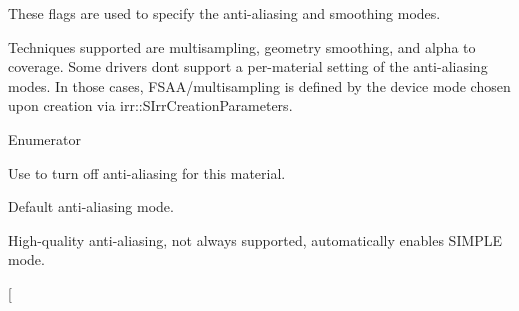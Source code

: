 These flags are used to specify the anti-\/aliasing and smoothing modes. 

Techniques supported are multisampling, geometry smoothing, and alpha to coverage. Some drivers don\textquotesingle{}t support a per-\/material setting of the anti-\/aliasing modes. In those cases, F\+S\+A\+A/multisampling is defined by the device mode chosen upon creation via irr\+::\+S\+Irr\+Creation\+Parameters. \begin{Desc}
\item[Enumerator]\par
\begin{description}
\item[{\em 
E\+A\+A\+M\+\_\+\+O\+FF\hypertarget{namespaceirr_1_1video_aa8647c2a52bdd3bc15ee773e8f2b149dab88de631372a6fc318762f20f1095433}{}\label{namespaceirr_1_1video_aa8647c2a52bdd3bc15ee773e8f2b149dab88de631372a6fc318762f20f1095433}
}]Use to turn off anti-\/aliasing for this material. \item[{\em 
E\+A\+A\+M\+\_\+\+S\+I\+M\+P\+LE\hypertarget{namespaceirr_1_1video_aa8647c2a52bdd3bc15ee773e8f2b149da05900b0839b8484a7ff78dbdac7e5dd7}{}\label{namespaceirr_1_1video_aa8647c2a52bdd3bc15ee773e8f2b149da05900b0839b8484a7ff78dbdac7e5dd7}
}]Default anti-\/aliasing mode. \item[{\em 
E\+A\+A\+M\+\_\+\+Q\+U\+A\+L\+I\+TY\hypertarget{namespaceirr_1_1video_aa8647c2a52bdd3bc15ee773e8f2b149da25f380a6b1ba75d0dc08ea624974ebd8}{}\label{namespaceirr_1_1video_aa8647c2a52bdd3bc15ee773e8f2b149da25f380a6b1ba75d0dc08ea624974ebd8}
}]High-\/quality anti-\/aliasing, not always supported, automatically enables S\+I\+M\+P\+LE mode. \item[{\em 
}
\end{description}
\end{Desc}
